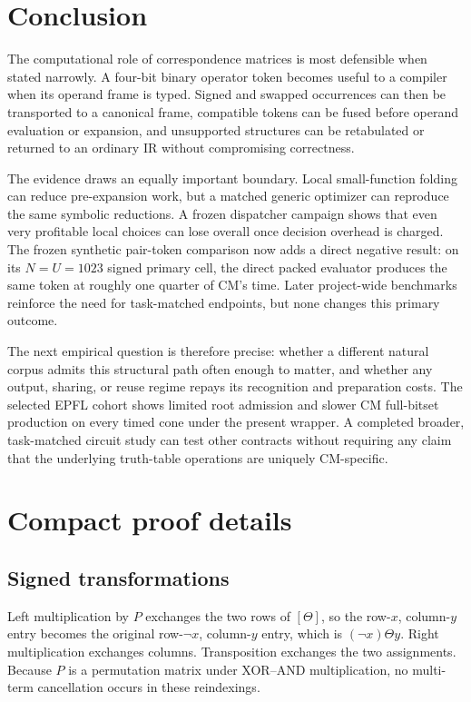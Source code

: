\documentclass[10pt]{article}
\theoremstyle{plain}
\theoremstyle{definition}
\theoremstyle{remark}
\begin{document}
\section{Conclusion}

The computational role of correspondence matrices is most defensible when stated narrowly. A four-bit binary operator token becomes useful to a compiler when its operand frame is typed. Signed and swapped occurrences can then be transported to a canonical frame, compatible tokens can be fused before operand evaluation or expansion, and unsupported structures can be retabulated or returned to an ordinary IR without compromising correctness.

The evidence draws an equally important boundary. Local small-function folding can reduce pre-expansion work, but a matched generic optimizer can reproduce the same symbolic reductions. A frozen dispatcher campaign shows that even very profitable local choices can lose overall once decision overhead is charged. The frozen synthetic pair-token comparison now adds a direct negative result: on its $N=U=1023$ signed primary cell, the direct packed evaluator produces the same token at roughly one quarter of CM's time. Later project-wide benchmarks reinforce the need for task-matched endpoints, but none changes this primary outcome.

The next empirical question is therefore precise: whether a different natural corpus admits this structural path often enough to matter, and whether any output, sharing, or reuse regime repays its recognition and preparation costs. The selected EPFL cohort shows limited root admission and slower CM full-bitset production on every timed cone under the present wrapper. A completed broader, task-matched circuit study can test other contracts without requiring any claim that the underlying truth-table operations are uniquely CM-specific.

\appendix

\section{Compact proof details}

\subsection{Signed transformations}

Left multiplication by $P$ exchanges the two rows of $[\Theta]$, so the row-$x$, column-$y$ entry becomes the original row-$\neg x$, column-$y$ entry, which is $(\neg x)\Theta y$. Right multiplication exchanges columns. Transposition exchanges the two assignments. Because $P$ is a permutation matrix under XOR--AND multiplication, no multi-term cancellation occurs in these reindexings.
\end{document}
